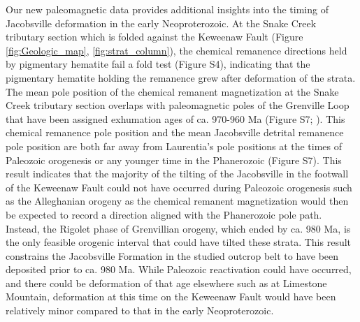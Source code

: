 Our new paleomagnetic data provides additional insights into the timing of Jacobsville deformation in the early Neoproterozoic. At the Snake Creek tributary section which is folded against the Keweenaw Fault (Figure \ref{fig:Geologic_map}, \ref{fig:strat_column}), the chemical remanence directions held by pigmentary hematite fail a fold test (Figure S4), indicating that the pigmentary hematite holding the remanence grew after deformation of the strata. The mean pole position of the chemical remanent magnetization at the Snake Creek tributary section overlaps with paleomagnetic poles of the Grenville Loop that have been assigned exhumation ages of ca. 970-960 Ma (Figure S7; ). This chemical remanence pole position and the mean Jacobsville detrital remanence pole position are both far away from Laurentia's pole positions at the times of Paleozoic orogenesis or any younger time in the Phanerozoic (Figure S7). This result indicates that the majority of the tilting of the Jacobsville in the footwall of the Keweenaw Fault could not have occurred during Paleozoic orogenesis such as the Alleghanian orogeny as the chemical remanent magnetization would then be expected to record a direction aligned with the Phanerozoic pole path. Instead, the Rigolet phase of Grenvillian orogeny, which ended by ca. 980 Ma, is the only feasible orogenic interval that could have tilted these strata. This result constrains the Jacobsville Formation in the studied outcrop belt to have been deposited prior to ca. 980 Ma. While Paleozoic reactivation could have occurred, and there could be deformation of that age elsewhere such as at Limestone Mountain, deformation at this time on the Keweenaw Fault would have been relatively minor compared to that in the early Neoproterozoic.

